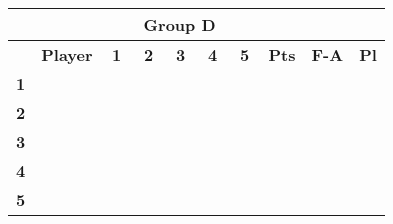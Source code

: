 \documentclass[10pt]{article}
\newcommand{\red}{\color{red}}
\newcommand{\blue}{\color{blue}}
\newcommand{\blank}{\cellcolor[gray]{.5}}
\begin{document}
\begin{tabular}{|c|p{2.8cm}|c|c|c|c|c|c|c|c|}
	\multicolumn{9}{c}{\bf Group D} \\ \hline
	& \bf Player & \bf1 & \bf2 & \bf3 & \bf4 & \bf5 & \bf Pts & \bf F-A & \bf Pl \\ \hline
	\multirow{2}{*}{\bf1}&\multirow{2}{*}{}      & \blank$\quad$ & \red$\quad$ & \red$\quad$ & \red$\quad$ & \red$\quad$ &\multirow{2}{*}{}&\multirow{2}{*}{}&\multirow{2}{*}{} \\ && \blank & \red & \blue & \red & \red &&& \\ \hline
	\multirow{2}{*}{\bf2}&\multirow{2}{*}{\it}     & \blue & \blank & \red & \red & \red &\multirow{2}{*}{}&\multirow{2}{*}{}&\multirow{2}{*}{} \\      && \blue & \blank &  & \red & \red &&& \\ \hline
	\multirow{2}{*}{\bf3}&\multirow{2}{*}{\it}     & \blue & \blue & \blank & \red & \red &\multirow{2}{*}{}&\multirow{2}{*}{}&\multirow{2}{*}{} \\     && \red &  & \blank & \blue & \red &&& \\ \hline
	\multirow{2}{*}{\bf4}&\multirow{2}{*}{\it}     & \blue & \blue & \blue & \blank & \red &\multirow{2}{*}{}&\multirow{2}{*}{}&\multirow{2}{*}{} \\     && \blue & \blue & \red & \blank & \red &&& \\ \hline
	\multirow{2}{*}{\bf5}&\multirow{2}{*}{\it}     & \blue & \blue & \blue & \red & \blank &\multirow{2}{*}{}&\multirow{2}{*}{}&\multirow{2}{*}{} \\     && \blue & \blue & \red & \red & \blank &&& \\ \hline
\end{tabular}
\hspace{-1.5cm}
\bigskip

\end{document}
